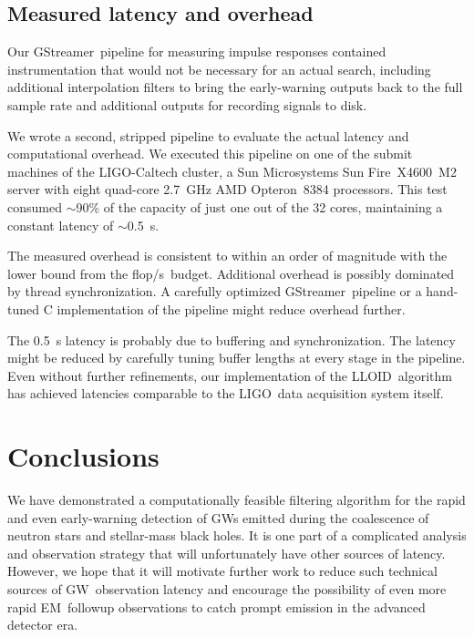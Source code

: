 \documentclass[preprint2]{aastex}
\newcommand{\GW}{GW}%
\newcommand{\EM}{EM}%
\newcommand{\LIGO}{LIGO}%
\newcommand{\flops}{flop/s}
\newcommand{\gstreamer}{GStreamer}
\newcommand{\lloid}{LLOID}%
\begin{document}
\subsection{Measured latency and overhead}

Our \gstreamer\ pipeline for measuring impulse responses contained
instrumentation that would not be necessary for an actual search, including
additional interpolation filters to bring the early-warning outputs back to the
full sample rate and additional outputs for recording signals to disk.

We wrote a second, stripped pipeline to evaluate the actual latency and
computational overhead.  We executed this pipeline on one of the submit
machines of the \LIGO-Caltech cluster, a Sun Microsystems Sun
Fire\texttrademark\ X4600~M2 server with eight quad-core 2.7~GHz AMD
Opteron\texttrademark\ 8384 processors.  This test consumed $\sim$90\% of the
capacity of just one out of the 32 cores, maintaining a constant latency of
$\sim$0.5~s.

The measured overhead is consistent to within an order of magnitude with the
lower bound from the \flops\ budget.  Additional overhead is possibly
dominated by thread synchronization.  A carefully optimized \gstreamer\
pipeline or a hand-tuned C implementation of the pipeline might reduce overhead
further.

The 0.5~s latency is probably due to buffering and synchronization.  The latency
might be reduced by carefully tuning buffer lengths at every stage in the
pipeline.  Even without further refinements, our implementation of the \lloid\
algorithm has achieved latencies comparable to the \LIGO\ data acquisition
system itself.  

\section{Conclusions}

We have demonstrated a computationally feasible filtering algorithm for the rapid
and even early-warning detection of \GW{}s emitted during the coalescence
of neutron stars and stellar-mass black holes.  It is one part of a complicated
analysis and observation strategy that will unfortunately have other sources of
latency.  However, we hope that it will motivate further work to reduce such
technical sources of \GW\ observation latency and encourage the possibility of
even more rapid \EM\ followup observations to catch prompt emission in the
advanced detector era.
\end{document}
